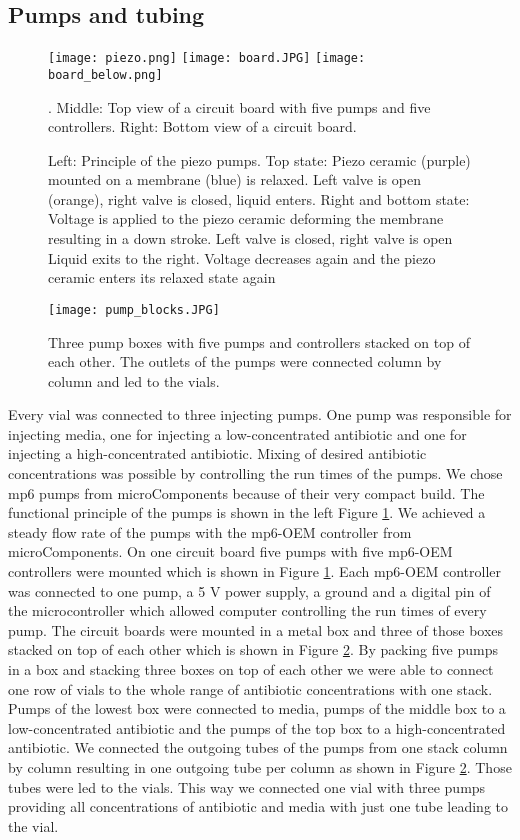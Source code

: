 \subsection{Pumps and tubing} 
\begin{figure}
	\texttt{[image: piezo.png]}
	\texttt{[image: board.JPG]}
	\texttt{[image: board\_below.png]}
	\caption{Left: Principle of the piezo pumps. Top state: Piezo ceramic (purple) mounted on a membrane (blue) is relaxed. Left valve is open (orange), right valve  is closed, liquid enters. Right and bottom state: Voltage is applied to the piezo ceramic deforming the membrane resulting in a down stroke. Left valve is closed, right valve is open Liquid exits to the right. Voltage decreases again and the piezo ceramic enters its relaxed state again \cite{piezo_pumps}}. Middle: Top view of a circuit board with five pumps and five controllers. Right: Bottom view of a circuit board. 
	\label{figure:pumps}
\end{figure}
\begin{figure}
	\texttt{[image: pump\_blocks.JPG]}
	\caption{Three pump boxes with five pumps and controllers stacked on top of each other. The outlets of the pumps were connected column by column and led to the vials.}
	\label{figure:tubing_setup}
\end{figure}
Every vial was connected to three injecting pumps. One pump was responsible for injecting media, one for injecting a low-concentrated antibiotic and one for injecting a high-concentrated antibiotic. Mixing of desired antibiotic concentrations was possible by controlling the run times of the pumps.
We chose mp6 pumps from microComponents because of their very compact build. The functional principle of the pumps is shown in the left Figure \ref{figure:pumps}. We achieved a steady flow rate of the pumps with the mp6-OEM controller from microComponents. On one circuit board five pumps with five mp6-OEM controllers were mounted which is shown in Figure \ref{figure:pumps}. Each mp6-OEM controller was connected to one pump, a 5 V power supply, a ground and a digital pin of the microcontroller which allowed computer controlling the run times of every pump. The circuit boards were mounted in a metal box and three of those boxes stacked on top of each other which is shown in Figure \ref{figure:tubing_setup}. By packing five pumps in a box and stacking three boxes on top of each other we were able to connect one row of vials to the whole range of antibiotic concentrations with one stack. Pumps of the lowest box were connected to media, pumps of the middle box to a low-concentrated antibiotic and the pumps of the top box to a high-concentrated antibiotic. We connected the outgoing tubes of the pumps from one stack column by column resulting in one outgoing tube per column as shown in Figure \ref{figure:tubing_setup}. Those tubes were led to the vials. This way we connected one vial with three pumps providing all concentrations of antibiotic and media with just one tube leading to the vial.\\
